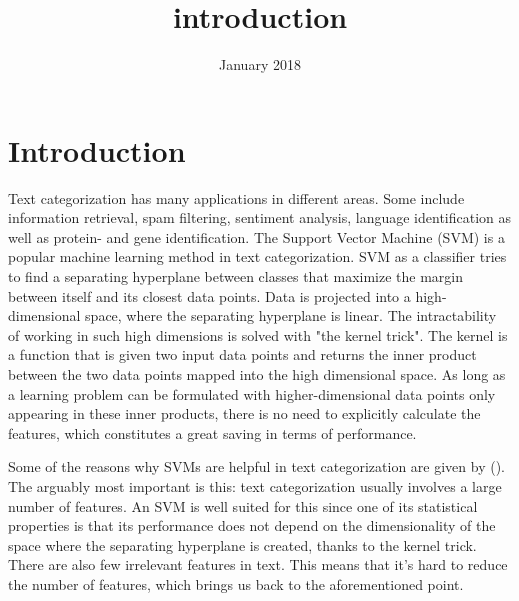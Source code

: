 \documentclass{article}
\title{introduction}
\date{January 2018}
\begin{document}

\section{Introduction}


Text categorization has many applications in different areas. Some include information retrieval, spam filtering, sentiment analysis, language identification as well as protein- and gene identification. The Support Vector Machine (SVM) is a popular machine learning method in text categorization. SVM as a classifier tries to find a separating hyperplane between classes that maximize the margin between itself and its closest data points. Data is projected into a high-dimensional space, where the separating hyperplane is linear. The intractability of working in such high dimensions is solved with "the kernel trick". The kernel is a function that is given two input data points and returns the inner product between the two data points mapped into the high dimensional space. As long as a learning problem can be formulated with higher-dimensional data points only appearing in these inner products, there is no need to explicitly calculate the features, which constitutes a great saving in terms of performance.

Some of the reasons why SVMs are helpful in text categorization are given by (\cite{joachims1998text}). The arguably most important is this: text categorization usually involves a large number of features. An SVM is well suited for this since one of its statistical properties is that its performance does not depend on the dimensionality of the space where the separating hyperplane is created, thanks to the kernel trick. There are also few irrelevant features in text. This means that it's hard to reduce the number of features, which brings us back to the aforementioned point. 
\end{document}
